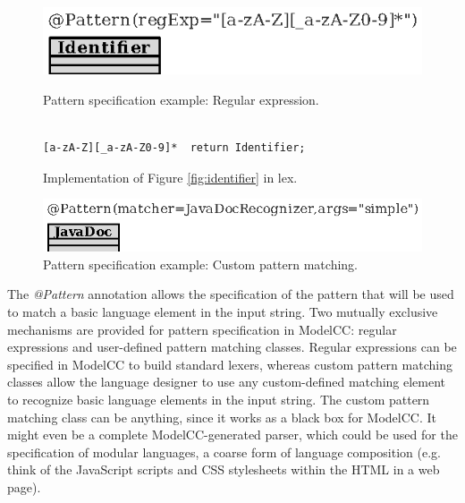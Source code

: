 \documentclass[a4paper,twoside,onecolumn]{article}
\newcommand{\an}[1]{\emph{#1}} %
\begin{document}
\begin{figure}[tb!]
\begin{minipage}{\linewidth}
\centering
\includegraphics[scale=1]{identifier.eps}
\caption{Pattern specification example: Regular expression.} \label{fig:identifier}
\end{minipage}

\vspace{1mm}
\begin{minipage}{\linewidth}

\begin{center} \begin{minipage}{7.1cm} \vspace{4mm}
\begin{verbatim}

[a-zA-Z][_a-zA-Z0-9]*  return Identifier;
\end{verbatim}
\vspace{-6mm} \end{minipage} \end{center}

\caption{Implementation of Figure \ref{fig:identifier} in lex.}
\label{fig:identifierg}

\end{minipage}

\vspace{3mm}
\begin{minipage}{\linewidth}
\centering
\includegraphics[scale=1]{javadoc.eps}
\caption{Pattern specification example: Custom pattern matching.} \label{fig:javadoc}
\end{minipage}

\end{figure}

The \an{@Pattern} annotation allows the specification of the pattern that will be used to match a basic language element in the input string.
Two mutually exclusive mechanisms are provided for pattern specification in ModelCC: regular expressions and user-defined pattern matching classes.
Regular expressions can be specified in ModelCC to build standard lexers, whereas custom pattern matching classes allow the language designer to use any custom-defined matching element to recognize basic language elements in the input string.
The custom pattern matching class can be anything, since it works as a black box for ModelCC.
It might even be a complete ModelCC-generated parser, which could be used for the specification of modular languages, a coarse form of language composition (e.g. think of the JavaScript scripts and CSS stylesheets within the
HTML in a web page).
\end{document}
